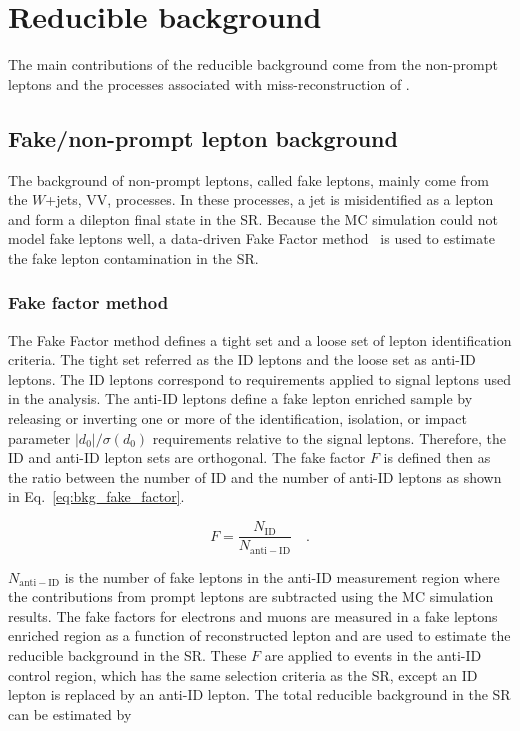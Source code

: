 
\section{Reducible background}
\label{sec:bkg_reducible_background}
The main contributions of the reducible background come from the non-prompt leptons and the processes associated with miss-reconstruction of \met.%


\subsection{Fake/non-prompt lepton background}
\label{subsec:bkg_fake_lepton_background}
The background of non-prompt leptons, called fake leptons, mainly come from the $W$+jets, VV, \ttbar processes.
In these processes, a jet is misidentified as a lepton and form a dilepton final state in the SR.
Because the MC simulation could not model fake leptons well, a data-driven Fake Factor method~\cite{ATLAS:2014aga} is used to estimate the fake lepton contamination in the SR. 


\subsubsection{Fake factor method}
\label{subsubsec:bkg_fake_factor_method}
The Fake Factor method defines a tight set and a loose set of lepton identification criteria.
The tight set referred as the ID leptons and the loose set as anti-ID leptons.
The ID leptons correspond to requirements applied to signal leptons used in the analysis.
The anti-ID leptons define a fake lepton enriched sample by releasing or inverting one or more of the identification, isolation, or impact parameter $|d_{0}|/\sigma(d_{0})$ requirements relative to the signal leptons.
Therefore, the ID and anti-ID lepton sets are orthogonal.
The fake factor $F$ is defined then as the ratio between the number of ID and the number of anti-ID leptons as shown in Eq.~\ref{eq:bkg_fake_factor}.

\begin{equation}
    F = \frac{N_\mathrm{ID}}{N_\mathrm{anti-ID}} \quad .
    \label{eq:bkg_fake_factor}
\end{equation}

$N_\mathrm{anti-ID}$ is the number of fake leptons in the anti-ID measurement region where the contributions from prompt leptons are subtracted using the MC simulation results.
The fake factors for electrons and muons are measured in a fake leptons enriched region as a function of reconstructed lepton \pt and are used to estimate the reducible background in the SR.
These $F$ are applied to events in the anti-ID control region, which has the same selection criteria as the SR, except an ID lepton is replaced by an anti-ID lepton.
The total reducible background in the SR can be estimated by

